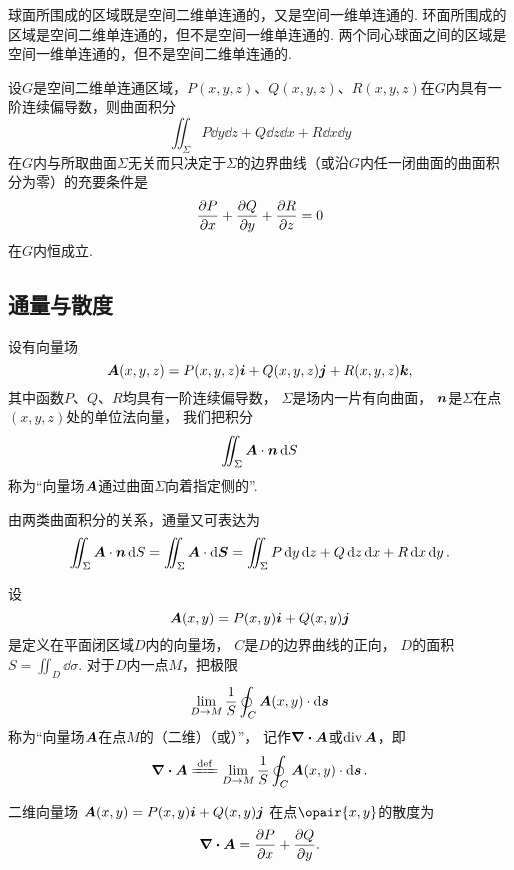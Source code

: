 \begin{example}
球面所围成的区域既是空间二维单连通的，又是空间一维单连通的.
环面所围成的区域是空间二维单连通的，但不是空间一维单连通的.
两个同心球面之间的区域是空间一维单连通的，但不是空间二维单连通的.
\end{example}

\begin{theorem}\label{theorem:线积分与面积分.沿任意闭曲面的曲面积分为零的条件}
设\(G\)是空间二维单连通区域，\(P(x,y,z)\)、\(Q(x,y,z)\)、\(R(x,y,z)\)在\(G\)内具有一阶连续偏导数，则曲面积分\[
\iint_\Sigma P\dd{y}\dd{z}+Q\dd{z}\dd{x}+R\dd{x}\dd{y}
\]在\(G\)内与所取曲面\(\Sigma\)无关而只决定于\(\Sigma\)的边界曲线（或沿\(G\)内任一闭曲面的曲面积分为零）的充要条件是\[
\pdv{P}{x}+\pdv{Q}{y}+\pdv{R}{z} = 0
\]在\(G\)内恒成立.
\end{theorem}

\subsection{通量与散度}
\begin{definition}
设有向量场\[
	\boldsymbol{A}(x,y,z)=P(x,y,z)\boldsymbol{i}+Q(x,y,z)\boldsymbol{j}+R(x,y,z)\boldsymbol{k},
\]
其中函数\(P\)、\(Q\)、\(R\)均具有一阶连续偏导数，
\(\Sigma\)是场内一片有向曲面，
\(\boldsymbol{n}\)是\(\Sigma\)在点\((x,y,z)\)处的单位法向量，
我们把积分\[
	\iint_\Sigma{\boldsymbol{A}\cdot\boldsymbol{n}\dd{S}}
\]称为“向量场\(\boldsymbol{A}\)通过曲面\(\Sigma\)向着指定侧的”.
\end{definition}
由两类曲面积分的关系，通量又可表达为\[
	\iint_\Sigma \boldsymbol{A}\cdot\boldsymbol{n}\dd{S}
	=\iint_\Sigma \boldsymbol{A}\cdot\dd{\boldsymbol{S}}
	=\iint_\Sigma P\dd{y}\dd{z}+Q\dd{z}\dd{x}+R\dd{x}\dd{y}.
\]

\begin{definition}[平面上的散度]
\def\defofdiv{\lim\limits_{D \to M} \frac{1}{S} \oint_C \vb{A}(x,y) \cdot \dd{\vb{s}}}%
设\[
	\boldsymbol{A}(x,y)=P(x,y)\boldsymbol{i}+Q(x,y)\boldsymbol{j}
\]是定义在平面闭区域\(D\)内的向量场，
\(C\)是\(D\)的边界曲线的正向，
\(D\)的面积\(S = \iint_{D} \dd{\sigma}\).
对于\(D\)内一点\(M\)，把极限\[
	\defofdiv
\]称为“向量场\(\boldsymbol{A}\)在点\(M\)的（二维）（或）”，
记作\(\div{\boldsymbol{A}}\)或\(\operatorname{div}\boldsymbol{A}\)，即\[
	\div{\vb{A}} \defeq \defofdiv.
\]
\end{definition}

\begin{proposition}
二维向量场
\(\boldsymbol{A}(x,y)=P(x,y)\boldsymbol{i}+Q(x,y)\boldsymbol{j}\)
在点\(\opair{x,y}\)的散度为\[
	\div{\boldsymbol{A}} = \pdv{P}{x}+\pdv{Q}{y}.
\]
\end{proposition}

